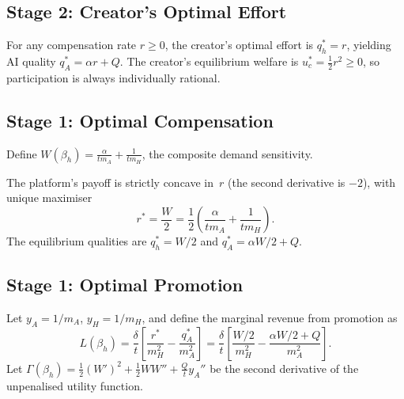 \documentclass[mnsc,nonblindrev]{informs3_NoOR}
\begin{document}
\subsection{Stage 2: Creator's Optimal Effort}
 
\begin{proposition}\label{prop:effort}
For any compensation rate $r \geq 0$, the creator's optimal effort is $q_h^* = r$, yielding AI quality $q_A^* = \alpha r + Q$. The creator's equilibrium welfare is $u_c^* = \tfrac{1}{2}r^2 \geq 0$, so participation is always individually rational.
\end{proposition}
 
\subsection{Stage 1: Optimal Compensation}
 
Define $W(\beta_h) = \frac{\alpha}{tm_A} + \frac{1}{tm_H}$, the composite demand sensitivity.
 
\begin{proposition}\label{prop:rstar-view}
The platform's payoff is strictly concave in~$r$ (the second derivative is $-2$), with unique maximiser
\begin{equation}\label{eq:rstar-view}
r^* = \frac{W}{2} = \frac{1}{2}\!\left(\frac{\alpha}{tm_A} + \frac{1}{tm_H}\right).
\end{equation}
The equilibrium qualities are $q_h^* = W/2$ and $q_A^* = \alpha W/2 + Q$.
\end{proposition}
 
\subsection{Stage 1: Optimal Promotion}
 
Let $y_A = 1/m_A$, $y_H = 1/m_H$, and define the marginal revenue from promotion as
\begin{equation}\label{eq:L-def}
L(\beta_h) = \frac{\delta}{t}\!\left[\frac{r^*}{m_H^2} - \frac{q_A^*}{m_A^2}\right] = \frac{\delta}{t}\!\left[\frac{W/2}{m_H^2} - \frac{\alpha W/2 + Q}{m_A^2}\right].
\end{equation}
Let $\Gamma(\beta_h) = \frac{1}{2}(W')^2 + \frac{1}{2}WW'' + \frac{Q}{t}y_A''$ be the second derivative of the unpenalised utility function.
 
\end{document}
